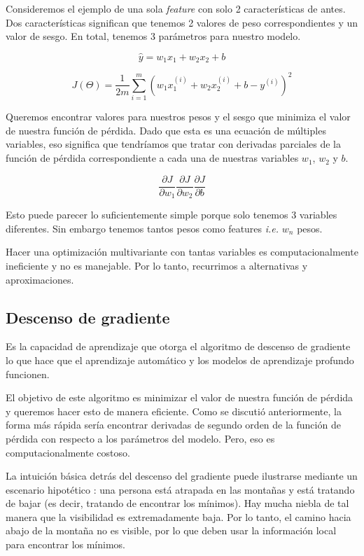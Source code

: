 \documentclass[a4paper,12pt]{article}
\begin{document}
Consideremos el ejemplo de una sola \textit{feature} con solo 2 características de antes. Dos características significan que tenemos 2 valores de peso correspondientes y un valor de sesgo. En total, tenemos 3 parámetros para nuestro modelo.

\begin{equation}
\hat{y} = w_1x_1 + w_2x_2 + b
\end{equation}

\begin{equation}
J(\Theta)=\frac{1}{2m} \sum_{i=1}^{m} (w_1x_1^{(i)}+w_2x_2^{(i)}+b-y^{(i)})^2
\end{equation}

Queremos encontrar valores para nuestros pesos y el sesgo que minimiza el valor de nuestra función de pérdida. Dado que esta es una ecuación de múltiples variables, eso significa que tendríamos que tratar con derivadas parciales de la función de pérdida correspondiente a cada una de nuestras variables $w_1$, $w_2$ y $b$.

\begin{equation}
\frac{\partial J}{\partial w_1} \frac{\partial J}{\partial w_2}
\frac{\partial J}{\partial b}
\end{equation}

Esto puede parecer lo suficientemente simple porque solo tenemos 3 variables diferentes.
Sin embargo tenemos tantos pesos como features \textit{i.e.} $w_n$ pesos.

Hacer una optimización multivariante con tantas variables es computacionalmente ineficiente y no es manejable. Por lo tanto, recurrimos a alternativas y aproximaciones.

\subsection{Descenso de gradiente}

Es la capacidad de aprendizaje que otorga el algoritmo de descenso de gradiente lo que hace que el aprendizaje automático y los modelos de aprendizaje profundo funcionen.

El objetivo de este algoritmo es minimizar el valor de nuestra función de pérdida y queremos hacer esto de manera eficiente.
Como se discutió anteriormente, la forma más rápida sería encontrar derivadas de segundo orden de la función de pérdida con respecto a los parámetros del modelo. Pero, eso es computacionalmente costoso.

La intuición básica detrás del descenso del gradiente puede ilustrarse mediante un escenario hipotético \citep{gdanalogy}: una persona está atrapada en las montañas y está tratando de bajar (es decir, tratando de encontrar los mínimos). Hay mucha niebla de tal manera que la visibilidad es extremadamente baja. Por lo tanto, el camino hacia abajo de la montaña no es visible, por lo que deben usar la información local para encontrar los mínimos.
\end{document}
